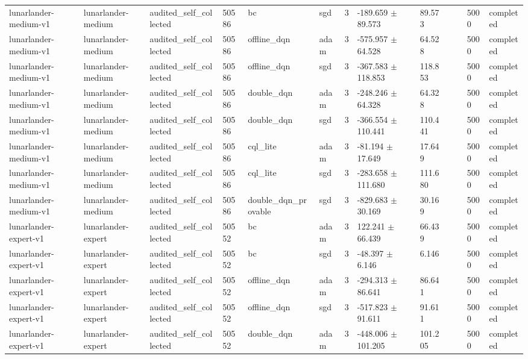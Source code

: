 \begin{table}[t]
\begin{tabular}{llllllllllll}
lunarlander-medium-v1 & lunarlander-medium & audited\_self\_collected & 50586 & bc & sgd & 3 & -189.659 $\pm$ 89.573 & 89.573 &  &  & 5000 & completed \\
lunarlander-medium-v1 & lunarlander-medium & audited\_self\_collected & 50586 & offline\_dqn & adam & 3 & -575.957 $\pm$ 64.528 & 64.528 &  &  & 5000 & completed \\
lunarlander-medium-v1 & lunarlander-medium & audited\_self\_collected & 50586 & offline\_dqn & sgd & 3 & -367.583 $\pm$ 118.853 & 118.853 &  &  & 5000 & completed \\
lunarlander-medium-v1 & lunarlander-medium & audited\_self\_collected & 50586 & double\_dqn & adam & 3 & -248.246 $\pm$ 64.328 & 64.328 &  &  & 5000 & completed \\
lunarlander-medium-v1 & lunarlander-medium & audited\_self\_collected & 50586 & double\_dqn & sgd & 3 & -366.554 $\pm$ 110.441 & 110.441 &  &  & 5000 & completed \\
lunarlander-medium-v1 & lunarlander-medium & audited\_self\_collected & 50586 & cql\_lite & adam & 3 & -81.194 $\pm$ 17.649 & 17.649 &  &  & 5000 & completed \\
lunarlander-medium-v1 & lunarlander-medium & audited\_self\_collected & 50586 & cql\_lite & sgd & 3 & -283.658 $\pm$ 111.680 & 111.680 &  &  & 5000 & completed \\
lunarlander-medium-v1 & lunarlander-medium & audited\_self\_collected & 50586 & double\_dqn\_provable & sgd & 3 & -829.683 $\pm$ 30.169 & 30.169 &  &  & 5000 & completed \\
lunarlander-expert-v1 & lunarlander-expert & audited\_self\_collected & 50552 & bc & adam & 3 & 122.241 $\pm$ 66.439 & 66.439 &  &  & 5000 & completed \\
lunarlander-expert-v1 & lunarlander-expert & audited\_self\_collected & 50552 & bc & sgd & 3 & -48.397 $\pm$ 6.146 & 6.146 &  &  & 5000 & completed \\
lunarlander-expert-v1 & lunarlander-expert & audited\_self\_collected & 50552 & offline\_dqn & adam & 3 & -294.313 $\pm$ 86.641 & 86.641 &  &  & 5000 & completed \\
lunarlander-expert-v1 & lunarlander-expert & audited\_self\_collected & 50552 & offline\_dqn & sgd & 3 & -517.823 $\pm$ 91.611 & 91.611 &  &  & 5000 & completed \\
lunarlander-expert-v1 & lunarlander-expert & audited\_self\_collected & 50552 & double\_dqn & adam & 3 & -448.006 $\pm$ 101.205 & 101.205 &  &  & 5000 & completed \\

\end{tabular}
\end{table}
